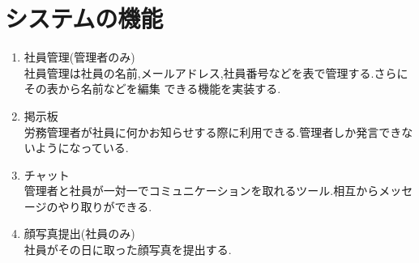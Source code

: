 \section{システムの機能}
\label{sec:chart_admin}

\renewcommand{\labelenumi}{(\arabic{enumi})}

\begin{enumerate}
  \item 社員管理(管理者のみ) \\
  社員管理は社員の名前,メールアドレス,社員番号などを表で管理する.さらにその表から名前などを編集
  できる機能を実装する.  \\

  \item 掲示板 \\
  労務管理者が社員に何かお知らせする際に利用できる.管理者しか発言できないようになっている. \\

  \item チャット \\
  管理者と社員が一対一でコミュニケーションを取れるツール.相互からメッセージのやり取りができる. \\

  \item  顔写真提出(社員のみ) \\
  社員がその日に取った顔写真を提出する.
\end{enumerate}

